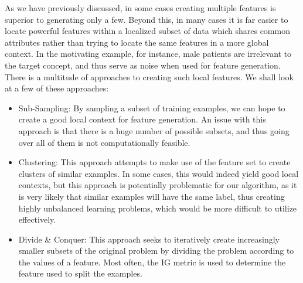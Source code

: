 \documentclass[twoside,11pt]{article}
\theoremstyle{definition}
\begin{document}
As we have previously discussed, in some cases creating multiple features is superior to generating only a few. Beyond this, in many cases it is far easier to locate powerful features within a localized subset of data which shares common attributes rather than trying to locate the same features in a more global context. In the motivating example, for instance, male patients are irrelevant to the target concept, and thus serve as noise when used for feature generation.
There is a multitude of approaches to creating such local features. We shall look at a few of these approaches:
\begin{itemize}
	\item Sub-Sampling: By sampling a subset of training examples, we can hope to create a good local context for feature generation. An issue with this approach is that there is a huge number of possible subsets, and thus going over all of them is not computationally feasible. 
	\item Clustering: This approach attempts to make use of the feature set to create clusters of similar examples. In some cases, this would indeed yield good local contexts, but this approach is potentially problematic for our algorithm, as it is very likely that similar examples will have the same label, thus creating highly unbalanced learning problems, which would be more difficult to utilize effectively.
	\item Divide \& Conquer: This approach seeks to iteratively create increasingly smaller subsets of the original problem by dividing the problem according to the values of a feature. Most often, the IG metric is used to determine the feature used to split the examples.
\end{itemize}
\end{document}

